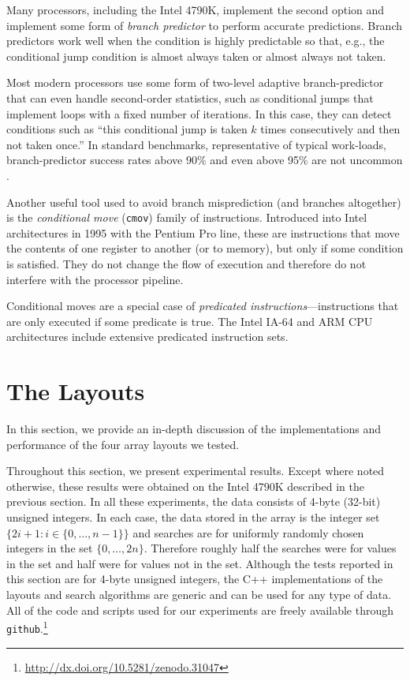 \documentclass{patmorin}
\begin{document}
Many processors, including the Intel 4790K, implement the second
option and implement some form of \emph{branch predictor} to perform
accurate predictions.  Branch predictors work well when the condition
is highly predictable so that, e.g., the conditional jump condition is
almost always taken or almost always not taken.

Most modern processors use some form of two-level adaptive branch-predictor
\cite{yeh.patt:two-level} that can even handle second-order statistics,
such as conditional jumps that implement loops with a fixed number of
iterations. In this case, they can detect conditions such as ``this
conditional jump is taken $k$ times consecutively and then not taken
once.''  In standard benchmarks, representative of typical work-loads,
branch-predictor success rates above 90\% and even above 95\% are not
uncommon \cite{yeh.patt:alternative}.

Another useful tool used to avoid branch misprediction (and branches
altogether) is the \emph{conditional move} (\texttt{cmov}) family
of instructions.  Introduced into Intel architectures in 1995 with
the Pentium Pro line, these are instructions that move the contents of
one register to another (or to memory), but only if some condition is
satisfied. They do not change the flow of execution and therefore do
not interfere with the processor pipeline.

Conditional moves are a special case of \emph{predicated
instructions}---instructions that are only executed if some predicate
is true.  The Intel IA-64 and ARM CPU architectures include extensive
predicated instruction sets.

\section{The Layouts}

In this section, we provide an in-depth discussion of the implementations
and performance of the four array layouts we tested.

Throughout this section, we present experimental results. Except
where noted otherwise, these results were obtained on the Intel
4790K described in the previous section.  In all these experiments,
the data consists of 4-byte (32-bit) unsigned integers. In each
case, the data stored in the array is the integer set $\{2i+1:
i\in\{0,\ldots,n-1\}\}$ and searches are for uniformly randomly chosen
integers in the set $\{0,\ldots,2n\}$.  Therefore roughly half the
searches were for values in the set and half were for values not in
the set.  Although the tests reported in this section are for 4-byte
unsigned integers, the C++ implementations of the layouts and search
algorithms are generic and can be used for any type of data. All of the
code and scripts used for our experiments are freely available through
\texttt{github}.\footnote{\url{http://dx.doi.org/10.5281/zenodo.31047}}
\end{document}

